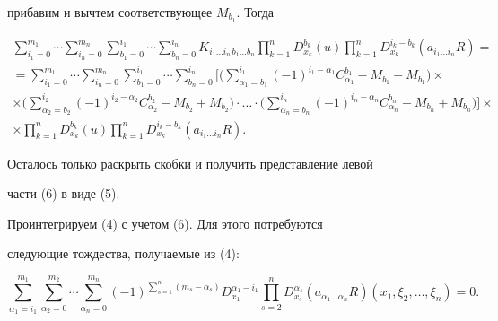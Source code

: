 прибавим и вычтем соответствующее $M_{b_1}$. Тогда 


\begin{multline} 


\sum^{m_1}_{i_1=0}\dotsb\sum^{m_n}_{i_n=0} 


\sum^{i_1}_{b_1=0}\dotsb\sum^{i_n}_{b_n=0} 


K_{i_1\dotsc i_n\,b_1\dotsc b_n}\prod^n_{k=1} 


D^{b_k}_{x_k}(u)\prod^n_{k=1}D^{i_k-b_k}_{x_k} 


(a_{i_1\dotsc i_n}R)= \\ 


% 


=\sum^{m_1}_{i_1=0}\dotsb \sum^{m_n}_{i_n=0}\sum^{i_1}_{b_1=0} 


\dotsb\sum^{i_n}_{b_n=0}\bigg[\bigg(\sum^{i_1}_{\alpha_1=b_1} 


(-1)^{i_1-\alpha_1}C^{b_1}_{\alpha_1}-M_{b_1}


+M_{b_1}\bigg)\times\\ 


% 


\times\bigg(\sum^{i_2}_{\alpha_2=b_2}(-1)^{i_2-\alpha_2} 


C^{b_2}_{\alpha_2}-M_{b_2}+M_{b_2}\bigg)\cdot\dotsc\cdot\bigg( 


\sum^{i_n}_{\alpha_n=b_n}(-1)^{i_n-\alpha_n} 


C^{b_n}_{\alpha_n}-M_{b_n}+M_{b_n}\bigg)\bigg]\times\\ 


% 


\times\prod^n_{k=1}D^{b_k}_{x_k}(u)\prod^n_{k=1} 


D^{i_k-b_k}_{x_k}(a_{i_1\dotsc i_n}R). 


\end{multline} 


Осталось только раскрыть скобки и получить представление левой 


части (6) в виде (5). 


 


Проинтегрируем (4) с учетом (6). Для этого потребуются 


следующие тождества, получаемые из (4): 


\begin{equation} 


\sum^{m_1}_{\alpha_1=i_1}\sum^{m_2}_{\alpha_2=0}\dotsb 


\sum^{m_n}_{\alpha_n=0} 


(-1)^{\sum\limits^n_{s=1}(m_s-\alpha_s)} 


D^{\alpha_1-i_1}_{x_1}\prod^n_{s=2}D^{\alpha_s}_{x_s} 


(a_{\alpha_1\dotsc\alpha_n}R)(x_1,\xi_2,\dotsc,\xi_n)=0. 


\end{equation} 


